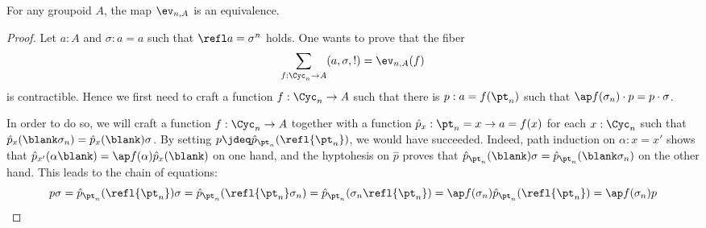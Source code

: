 \begin{theorem}
  For any groupoid $A$, the map $\ev_{n,A}$ is an equivalence.
  \label{prop:ump-cycn-into-groupoids}
\end{theorem}
\begin{proof}
  Let $a:A$ and $\sigma:a=a$ such that $\refl a = \sigma^n$ holds.
  One wants to prove that the fiber 
  \begin{displaymath}
    \sum_{f:\Cyc_n \to A} (a,\sigma, !) = \ev_{n,A}(f)
  \end{displaymath}
  is contractible. Hence we first need to craft a function $f:\Cyc_n \to A$
  such that there is $p:a=f(\pt_n)$ such that $\ap f (\sigma_n) \cdot p = p
  \cdot \sigma$.

  In order to do so, we will craft a function $f:\Cyc_n \to A$ together with a
  function $\hat p_x: \pt_n = x \to a = f(x)$ for each $x:\Cyc_n$ such that
  $\hat p_x(\blank\sigma_n) = \hat p_x(\blank) \sigma$. By setting $p \jdeq \hat
  p_{\pt_n}(\refl {\pt_n})$, we would have succeeded. Indeed, path induction on
  $\alpha: x = x'$ shows that $\hat p_{x'}(\alpha \blank) = \ap f (\alpha) \hat
  p_x(\blank)$ on one hand, and the hyptohesis on $\hat p$ proves that $\hat
  p_{\pt_n} (\blank) \sigma = \hat p_{\pt_n}(\blank \sigma_n)$ on the other
  hand. This leads to the chain of equations:
  \begin{displaymath}
    p \sigma = \hat p_{\pt_n}(\refl {\pt_n}) \sigma = \hat p_{\pt_n}(\refl {\pt_n}\sigma_n) = \hat p_{\pt_n}(\sigma_n\refl {\pt_n}) = \ap f (\sigma_n) \hat p_{\pt_n}(\refl {\pt_n}) = \ap f (\sigma_n) p 
  \end{displaymath}


\end{proof}
